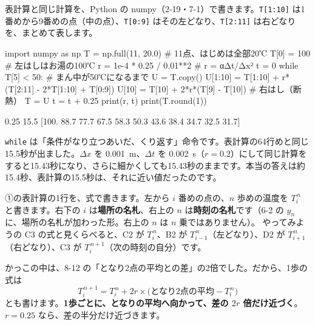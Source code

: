 表計算と同じ計算を、Python の numpy（2-19・7-1）で書きます。\texttt{T[1:10]} は1番めから9番めの点（中の点）、\texttt{T[0:9]} はその左どなり、\texttt{T[2:11]} は右どなりを、まとめて表します。\par\nobreak
{}
\begin{bkcode}[Python]
import numpy as np
T = np.full(11, 20.0)                \# 11点、はじめは全部20℃
T[0] = 100                           \# 左はしはお湯の100℃
r = 1e-4 * 0.25 / 0.01**2            \# r = αΔt/Δx²
t = 0
while T[5] < 50:                     \# まん中が50℃になるまで
    U = T.copy()
    U[1:10] = T[1:10] + r*(T[2:11] - 2*T[1:10] + T[0:9])
    U[10] = T[10] + 2*r*(T[9] - T[10])   \# 右はし（断熱）
    T = U
    t = t + 0.25
print(r, t)
print(T.round(1))
\end{bkcode}
\begin{bkcodeout}[実行結果]
0.25 15.5
[100.   88.7  77.7  67.5  58.3  50.3  43.6  38.4  34.7  32.5  31.7]
\end{bkcodeout}
\texttt{while} は「条件がなり立つあいだ、くり返す」命令です。表計算の64行めと同じ15.5秒が出ました。$\Delta x$ を \qty{0.001}{m}、$\Delta t$ を \qty{0.002}{s}（$r=0.2$）にして同じ計算をすると15.43秒になり、さらに細かくしても15.43秒のままです。本当の答えは約15.4秒、表計算の15.5秒は、それに近い値だったのです。



\label{bk:8-13:ippo}①の表計算の1行を、式で書きます。左から $i$ 番めの点の、$n$ 歩めの温度を $T_i^{\,n}$ と書きます。右下の $i$ は\textbf{場所の名札}、右上の $n$ は\textbf{時刻の名札}です（6-2 の $y_n$ に、場所の名札が加わった形。右上の $n$ は $n$ 乗ではありません）。
やってみようの C3 の式と見くらべると、C2 が $T_i^{\,n}$、B2 が $T_{i-1}^{\,n}$（左どなり）、D2 が $T_{i+1}^{\,n}$（右どなり）、C3 が $T_i^{\,n+1}$（次の時刻の自分）です。

かっこの中は、8-12 の「となり2点の平均との差」の2倍でした。だから、1歩の式は
\[ T_i^{\,n+1}=T_i^{\,n}+2r\times\bigl(\text{となり2点の平均}-T_i^{\,n}\bigr) \]
とも書けます。\textbf{1歩ごとに、となりの平均へ向かって、差の $2r$ 倍だけ近づく}。$r=0.25$ なら、差の半分だけ近づきます。

